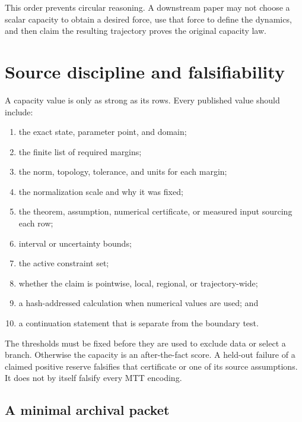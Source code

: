 \documentclass[11pt]{article}
\theoremstyle{definition}
\theoremstyle{remark}
\begin{document}
This order prevents circular reasoning.  A downstream paper may not choose
a scalar capacity to obtain a desired force, use that force to define the
dynamics, and then claim the resulting trajectory proves the original
capacity law.

\section{Source discipline and falsifiability}
\label{sec:source}

A capacity value is only as strong as its rows.  Every published value
should include:
\begin{enumerate}[leftmargin=2em]
\item the exact state, parameter point, and domain;
\item the finite list of required margins;
\item the norm, topology, tolerance, and units for each margin;
\item the normalization scale and why it was fixed;
\item the theorem, assumption, numerical certificate, or measured input
      sourcing each row;
\item interval or uncertainty bounds;
\item the active constraint set;
\item whether the claim is pointwise, local, regional, or trajectory-wide;
\item a hash-addressed calculation when numerical values are used; and
\item a continuation statement that is separate from the boundary test.
\end{enumerate}

The thresholds must be fixed before they are used to exclude data or select
a branch.  Otherwise the capacity is an after-the-fact score.  A held-out
failure of a claimed positive reserve falsifies that certificate or one of
its source assumptions.  It does not by itself falsify every MTT encoding.

\subsection{A minimal archival packet}
\end{document}
